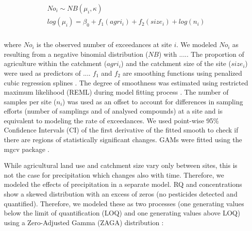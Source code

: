\documentclass[journal=esthag,manuscript=article]{achemso}
\begin{document}
\begin{align}
\begin{split}
  No_i \sim NB(\mu_i, \kappa) \\
  log(\mu_i)= \beta_0 + f_1(agri_i) + f_2(size_i) + log(n_i) \\
\end{split}
\end{align}

where $No_i$ is the observed number of exceedances at site $i$. 
We modeled $No_i$ as resulting from a negative binomial distribution ($NB$) with .....
The proportion of agriculture within the catchment ($agri_i$) and the catchment size of the site ($size_i$) were used as predictors of .... 
$f_1$ and $f_2$ are smoothing functions using penalized cubic regression splines \citep{wood_generalized_2006}.
The degree of smoothness was estimated using restricted maximum likelihood (REML) during model fitting process \citep{wood_fast_2011}.
The number of samples per site ($n_i$) was used as an offset to account for differences in sampling efforts (number of samplings and of analysed compounds) at a site and is equivalent to modeling the rate of exceedances. 
We used point-wise 95\% Confidence Intervals (CI) of the first derivative of the fitted smooth to check if there are regions of statistically significant changes.
GAMs were fitted using the mgcv package \citep{wood_fast_2011}.

While agricultural land use and catchment size vary only between sites, this is not the case for precipitation which changes also with time.
Therefore, we modeled the effects of precipitation in a separate model.
RQ and concentrations show a skewed distribution with an excess of zeros (no pesticides detected and quantified). 
Therefore, we modeled these as two processes 
(one generating values below the limit of quantification (LOQ) and one generating values above LOQ) using a Zero-Adjusted Gamma (ZAGA) distribution \cite{rigby_generalized_2005,stasinopoulos_gamlss.dist:_2016}:
\end{document}
